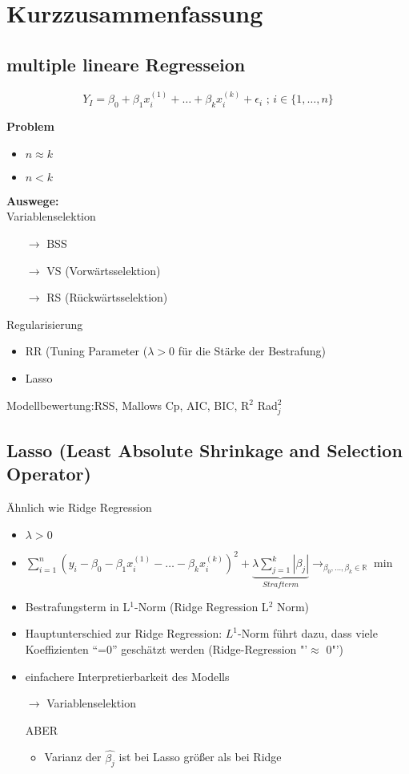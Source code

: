 \section{Kurzzusammenfassung}
\subsection{multiple lineare Regresseion}
\[Y_I = \beta_0 + \beta_1 x_i^{(1)} + \ldots + \beta_k x_i^{(k)} + \epsilon_i \text{ ; } i \in \{1, \ldots,n\}\]

\textbf{Problem}
\begin{itemize}
	\item \(n \approx k\)
	\item \(n < k\)
\end{itemize}
\textbf{Auswege:} \\
Variablenselektion
\begin{itemize}
	\item[\(\rightarrow\)] BSS
	\item[\(\rightarrow\)] VS (Vorwärtsselektion)
	\item[\(\rightarrow\)] RS (Rückwärtsselektion)
\end{itemize}
Regularisierung
\begin{itemize}
	\item RR (Tuning Parameter (\(\lambda > 0\) für die Stärke der Bestrafung)
	\item Lasso
\end{itemize}

Modellbewertung:RSS, Mallows Cp, AIC, BIC, R$^2$ Rad$_j^2$

\subsection{Lasso (Least Absolute Shrinkage and Selection Operator)}
Ähnlich wie Ridge Regression 
\begin{itemize}
	\item \(\lambda > 0 \)
	\item \(\sum_{i = 1}^{n}(y_i -\beta_0 - \beta_1 x_i^{(1)} - \ldots - \beta_k x_i^{(k)})^2 + \underbrace{\lambda \sum_{j = 1}^{k}|\beta_j|}_{Strafterm}
	\rightarrow_{\beta_0, \ldots, \beta_k \in \mathbb{R}} \min \)
	\item Bestrafungsterm in L$^1$-Norm (Ridge Regression L$^2$ Norm)
	\item Hauptunterschied zur Ridge Regression: $L^1$-Norm führt dazu, dass viele Koeffizienten "`=0"' geschätzt werden (Ridge-Regression "'$\approx$ 0"')
	\item einfachere Interpretierbarkeit des Modells
	\item [\(\rightarrow\)] Variablenselektion
	\item [ABER]
	\begin{itemize}
		\item Varianz der $ \hat{\beta_j} $ ist bei Lasso größer als bei Ridge
	\end{itemize}
\end{itemize}

